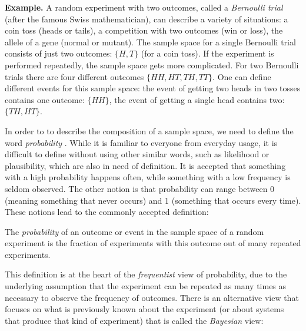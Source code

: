 \documentclass[
  letterpaper,
  DIV=11,
  numbers=noendperiod]{scrreprt}
\begin{document}
\textbf{Example.} A random experiment with two outcomes, called a
\emph{Bernoulli trial} (after the famous Swiss mathematician), can
describe a variety of situations: a coin toss (heads or tails), a
competition with two outcomes (win or loss), the allele of a gene
(normal or mutant). The sample space for a single Bernoulli trial
consists of just two outcomes: \(\{H,T\}\) (for a coin toss). If the
experiment is performed repeatedly, the sample space gets more
complicated. For two Bernoulli trials there are four different outcomes
\(\{HH, HT, TH, TT \}\). One can define different events for this sample
space: the event of getting two heads in two tosses contains one
outcome: \(\{HH\}\), the event of getting a single head contains two:
\(\{TH, HT\}\).

In order to to describe the composition of a sample space, we need to
define the word \emph{probability} \cite{feller_introduction_????}.
While it is familiar to everyone from everyday usage, it is difficult to
define without using other similar words, such as likelihood or
plausibility, which are also in need of definition. It is accepted that
something with a high probability happens often, while something with a
low frequency is seldom observed. The other notion is that probability
can range between 0 (meaning something that never occurs) and 1
(something that occurs every time). These notions lead to the commonly
accepted definition:

\begin{tcolorbox}[enhanced jigsaw, coltitle=black, arc=.35mm, opacitybacktitle=0.6, breakable, bottomtitle=1mm, toptitle=1mm, titlerule=0mm, colback=white, leftrule=.75mm, rightrule=.15mm, colframe=quarto-callout-note-color-frame, colbacktitle=quarto-callout-note-color!10!white, opacityback=0, title=\textcolor{quarto-callout-note-color}{\faInfo}\hspace{0.5em}{Definition}, left=2mm, toprule=.15mm, bottomrule=.15mm]

The \emph{probability} of an outcome or event in the sample space of a
random experiment is the fraction of experiments with this outcome out
of many repeated experiments.

\end{tcolorbox}

This definition is at the heart of the \emph{frequentist} view of
probability, due to the underlying assumption that the experiment can be
repeated as many times as necessary to observe the frequency of
outcomes. There is an alternative view that focuses on what is
previously known about the experiment (or about systems that produce
that kind of experiment) that is called the \emph{Bayesian} view:
\end{document}
